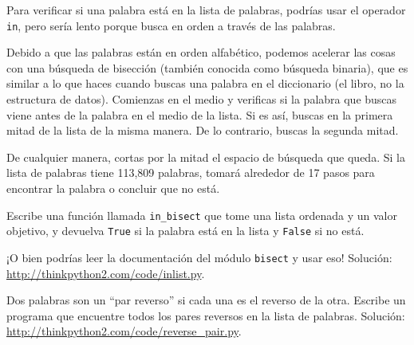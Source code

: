 \documentclass[10pt]{book}
\begin{document}
\begin{exercise}
\label{wordlist1}
\label{bisection}

Para verificar si una palabra está en la lista de palabras, podrías usar
el operador {\tt in}, pero sería lento porque busca
en orden a través de las palabras.

Debido a que las palabras están en orden alfabético, podemos acelerar las cosas
con una búsqueda de bisección (también conocida como búsqueda binaria), que es
similar a lo que haces cuando buscas una palabra en el diccionario (el libro, no la estructura de datos).
Comienzas en el medio y verificas si la palabra que buscas
viene antes de la palabra en el medio de la lista.  Si es así,
buscas en la primera mitad de la lista de la misma manera.  De lo contrario, buscas
la segunda mitad.

De cualquier manera, cortas por la mitad el espacio de búsqueda que queda.  Si la
lista de palabras tiene 113,809 palabras, tomará alrededor de 17 pasos
para encontrar la palabra o concluir que no está.

Escribe una función llamada \verb"in_bisect" que tome una lista ordenada
y un valor objetivo, y devuelva {\tt True} si la palabra está
en la lista y {\tt False} si no está.

¡O bien podrías leer la documentación del módulo {\tt bisect}
y usar eso!  Solución: \url{http://thinkpython2.com/code/inlist.py}.

\end{exercise}

\begin{exercise}

Dos palabras son un ``par reverso'' si cada una es el reverso de la
otra.  Escribe un programa que encuentre todos los pares reversos en la
lista de palabras.  Solución: \url{http://thinkpython2.com/code/reverse_pair.py}.

\end{exercise}
\end{document}
